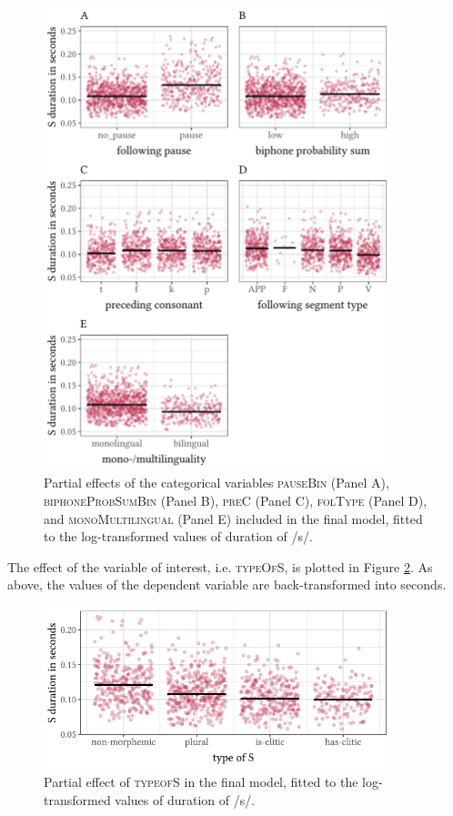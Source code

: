 \begin{figure}
    \centering
    \includegraphics[width=0.9\textwidth]{figures/fig4.5.pdf}
    \caption{Partial effects of the categorical variables \textsc{pauseBin} (Panel A), \textsc{biphoneProbSumBin} (Panel B), \textsc{preC} (Panel C), \textsc{folType} (Panel D), and \textsc{monoMultilingual} (Panel E) included in the final model, fitted to the log-transformed values of duration of /s/.}
    \label{fig:4_5}
\end{figure}

The effect of the variable of interest, i.e. \textsc{typeOfS}, is plotted in Figure \ref{fig:4_6}. As above, the values of the dependent variable are back-transformed into seconds.

\begin{figure}
    \centering
    \includegraphics[width=0.9\textwidth]{figures/fig4.6.pdf}
    \caption{Partial effect of \textsc{typeofS} in the final model, fitted to the log-transformed values of duration of /s/.}
    \label{fig:4_6}
\end{figure}

